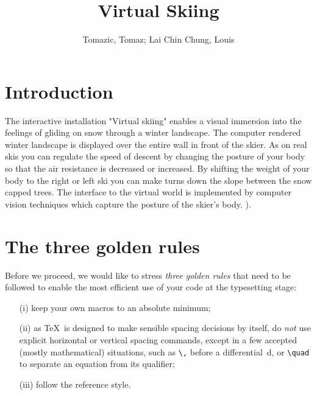 \documentclass[fonts]{icst}
\begin{document}

\title{Virtual Skiing}

\author{Tomazic, Tomaz; Lai Chin Chung, Louis}

\address{University of Ljubljana, Faculty of informatics and computer science}



\tnotetext[1]{Please ensure that you use the most up to date
class file,
available from XXXXX at \dots
}


\maketitle

\section{Introduction}
The interactive installation "Virtual skiing" enables a visual immersion into the feelings of gliding on snow through a winter landscape. The computer rendered winter landscape is displayed over the entire wall in front of the skier. As on real skis you can regulate the speed of descent by changing the posture of your body so that the air resistance is decreased or increased. By shifting the weight of your body to the right or left ski you can make turns down the slope between the snow capped trees. The interface to the virtual world is implemented by computer vision techniques which capture the posture of the skier’s body. \cite{ORIG}).

\section{The three golden rules}
Before we proceed, we would like to stress \emph{three golden
rules} that need to be followed to enable the most efficient use
of your code at the typesetting stage:
\begin{enumerate}
\item[(i)] keep your own macros to an absolute minimum;

\item[(ii)] as \TeX\ is designed to make sensible spacing
decisions by itself, do \emph{not} use explicit horizontal or
vertical spacing commands, except in a few accepted (mostly
mathematical) situations, such as \verb"\," before a
differential~d, or \verb"\quad" to separate an equation from its
qualifier;

\item[(iii)] follow the \emph{\journalnamelc} reference style.
\end{enumerate}
\end{document}
